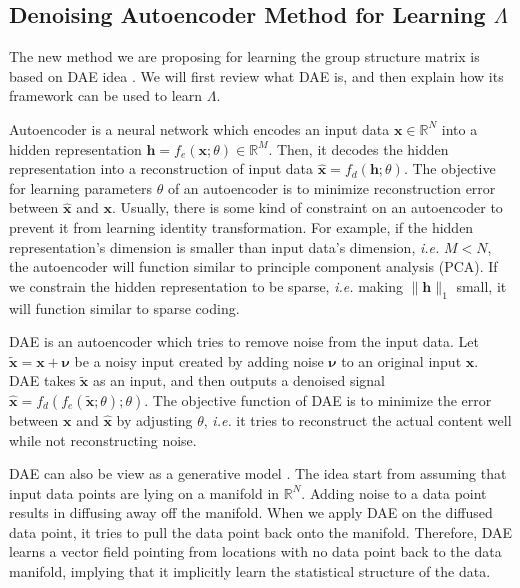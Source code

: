 \subsection{Denoising Autoencoder Method for Learning $\Lambda$}
\label{sec:method_lambda}

The new method we are proposing for learning the group structure matrix is based on DAE idea \cite{by13}. We will first review what DAE is, and then explain how its framework can be used to learn $\Lambda$.

Autoencoder is a neural network which encodes an input data $\boldsymbol{x} \in \mathbb{R}^N$ into a hidden representation $\boldsymbol{h} = f_e(\boldsymbol{x}; \theta) \in \mathbb{R}^M$. Then, it decodes the hidden representation into a reconstruction of input data $\hat{\boldsymbol{x}} = f_d(\boldsymbol{h}; \theta)$. The objective for learning parameters $\theta$ of an autoencoder is to minimize reconstruction error between $\hat{\boldsymbol{x}}$ and $\boldsymbol{x}$. Usually, there is some kind of constraint on an autoencoder to prevent it from learning identity transformation. For example, if the hidden representation's dimension is smaller than input data's dimension, \textit{i.e.} $M < N$, the autoencoder will function similar to principle component analysis (PCA). If we constrain the hidden representation to be sparse, \textit{i.e.} making $\|\boldsymbol{h}\|_1$ small, it will function similar to sparse coding.

DAE is an autoencoder which tries to remove noise from the input data. Let $\tilde{\boldsymbol{x}} = \boldsymbol{x} + \boldsymbol{\nu}$ be a noisy input created by adding noise $\boldsymbol{\nu}$ to an original input $\boldsymbol{x}$. DAE takes $\tilde{\boldsymbol{x}}$ as an input, and then outputs a denoised signal $\hat{\boldsymbol{x}} = f_d(f_e(\tilde{\boldsymbol{x}}; \theta); \theta)$. The objective function of DAE is to minimize the error between $\boldsymbol{x}$ and $\hat{\boldsymbol{x}}$ by adjusting $\theta$, \textit{i.e.} it tries to reconstruct the actual content well while not reconstructing noise.

DAE can also be view as a generative model \cite{by13, sj15}. The idea start from assuming that input data points are lying on a manifold in $\mathbb{R}^N$. Adding noise to a data point results in diffusing away off the manifold. When we apply DAE on the diffused data point, it tries to pull the data point back onto the manifold. Therefore, DAE learns a vector field pointing from locations with no data point back to the data manifold, implying that it implicitly learn the statistical structure of the data.


